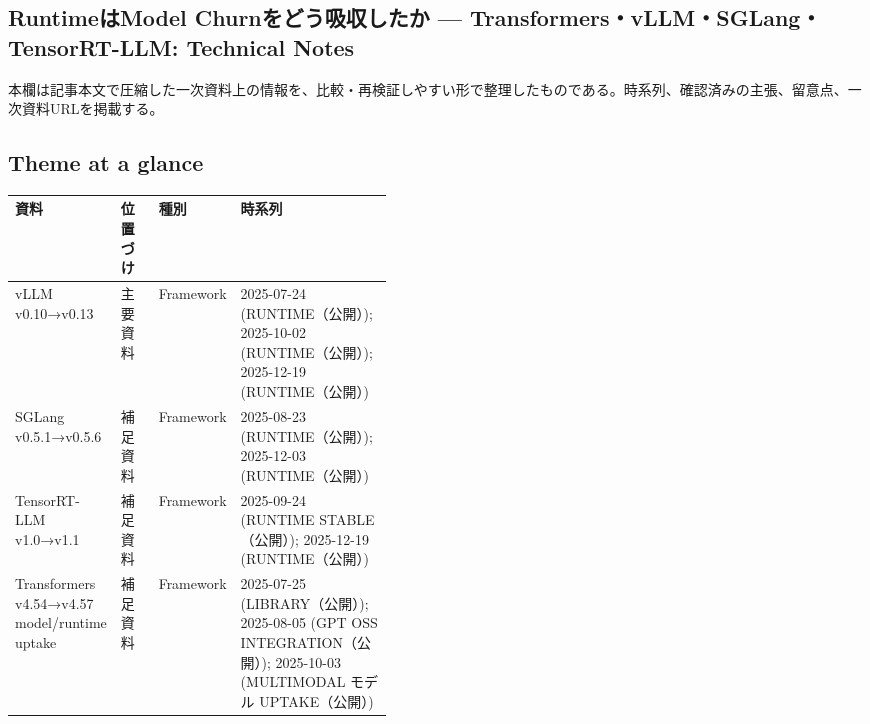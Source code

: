 \subsection*{RuntimeはModel Churnをどう吸収したか — Transformers・vLLM・SGLang・TensorRT-LLM: Technical Notes}
本欄は記事本文で圧縮した一次資料上の情報を、比較・再検証しやすい形で整理したものである。時系列、確認済みの主張、留意点、一次資料URLを掲載する。
\medskip
\subsection*{Theme at a glance}
\begin{center}
\footnotesize
\begin{tabularx}{\linewidth}{@{}p{0.20\linewidth}p{0.10\linewidth}p{0.14\linewidth}X@{}}
\toprule
資料 & 位置づけ & 種別 & 時系列 \\
\midrule
vLLM v0.10→v0.13 & 主要資料 & Framework & 2025-07-24 (RUNTIME（公開）); 2025-10-02 (RUNTIME（公開）); 2025-12-19 (RUNTIME（公開）)  \\
SGLang v0.5.1→v0.5.6 & 補足資料 & Framework & 2025-08-23 (RUNTIME（公開）); 2025-12-03 (RUNTIME（公開）)  \\
TensorRT-LLM v1.0→v1.1 & 補足資料 & Framework & 2025-09-24 (RUNTIME STABLE（公開）); 2025-12-19 (RUNTIME（公開）)  \\
Transformers v4.54→v4.57 model/runtime uptake & 補足資料 & Framework & 2025-07-25 (LIBRARY（公開）); 2025-08-05 (GPT OSS INTEGRATION（公開）); 2025-10-03 (MULTIMODAL モデル UPTAKE（公開）)  \\
\bottomrule
\end{tabularx}
\end{center}
\normalsize

